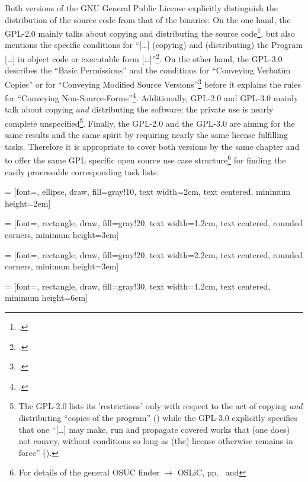 Both versions of the GNU General Public License explicitly distinguish the
distribution of the source code from that of the binaries: On the one hand, the
GPL-2.0 mainly talks about copying and distributing the source
code\footcite[cf.][\nopage wp.\ §1, §2]{Gpl20OsiLicense1991a}, but also mentions
the specific conditions for \enquote{[\ldots] (copying) and (distributing) the
Program [\ldots] in object code or executable form
[\ldots]}\footcite[cf.][\nopage wp.\ §3]{Gpl20OsiLicense1991a}. On the other
hand, the GPL-3.0 describes the \enquote{Basic Permissions} and the conditions
for \enquote{Conveying Verbatim Copies} or for \enquote{Conveying Modified
Source Versions}\footcite[cf.][\nopage wp.\ §2, §4, §5]{Gpl30OsiLicense2007a}
before it explains the rules for \enquote{Conveying
Non-Source-Forms}\footcite[cf.][\nopage wp.\ §2, §4, §5]{Gpl30OsiLicense2007a}.
Additionally, GPL-2.0 and GPL-3.0 mainly talk about copying \emph{and}
distributing the software; the private use is nearly complete
unspecified\footnote{The GPL-2.0 lists its 'restrictions' only with respect to
the act of copying \emph{and} distributing \enquote{copies of the program}
(\cite[cf.][\nopage wp.\ §1, §2, §4 et passim; emphasizings by
KR]{Gpl20OsiLicense1991a}) while the GPL-3.0 explicitly specifies that one
\enquote{[\ldots] may make, run and propagate covered works that (one does) not
convey, without conditions so long as (the) license otherwise remains in force}
(\cite[cf.][\nopage wp.\ §2]{Gpl30OsiLicense2007a}).}. Finally, the GPL-2.0 and
the GPL-3.0 are aiming for the same results and the same spirit by requiring
nearly the same license fulfilling tasks. Therefore it is appropriate to cover
both versions by the same chapter and to offer the same GPL specific open source
use case structure\footnote{For details of the general OSUC finder $\rightarrow$
OSLiC, pp.\ \pageref{OsucTokens} and \pageref{OsucDefinitionTree}} for finding
the easily processable corresponding task lists:
 
 = [font=\small, ellipse, draw, fill=gray!10, 
    text width=2cm, text centered, minimum height=2em]


 = [font=\footnotesize, rectangle, draw, fill=gray!20, 
    text width=1.2cm, text centered, rounded corners, minimum height=3em]

 = [font=\footnotesize, rectangle, draw, fill=gray!20, 
    text width=2.2cm, text centered, rounded corners, minimum height=3em]
    
 = [font=\tiny, rectangle, draw, fill=gray!30, 
    text width=1.2cm, text centered, minimum height=6em]

